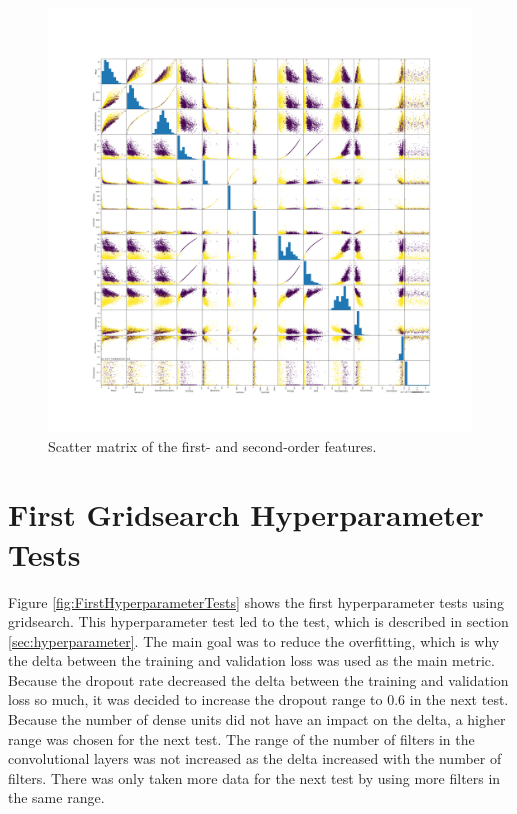 \begin{figure}[H]
    \centering
    \includegraphics[width=.8\textwidth]{plots/scatter_matrix.png}
    \caption{Scatter matrix of the first- and second-order features.}
    \label{fig:scatter_matrix}
\end{figure}


\section{First Gridsearch Hyperparameter Tests}
\label{sec:FirstGridsearchHyperparameterTests}

Figure \ref{fig:FirstHyperparameterTests} shows the first hyperparameter tests using gridsearch.
This hyperparameter test led to the test, which is described in section \ref{sec:hyperparameter}.
The main goal was to reduce the overfitting, which is why the delta between the training and validation loss was used as the main metric. 
Because the dropout rate decreased the delta between the training and validation loss so much, it was decided to increase the dropout range to 0.6 in the next test.
Because the number of dense units did not have an impact on the delta, a higher range was chosen for the next test.
The range of the number of filters in the convolutional layers was not increased as the delta increased with the number of filters.
There was only taken more data for the next test by using more filters in the same range.

